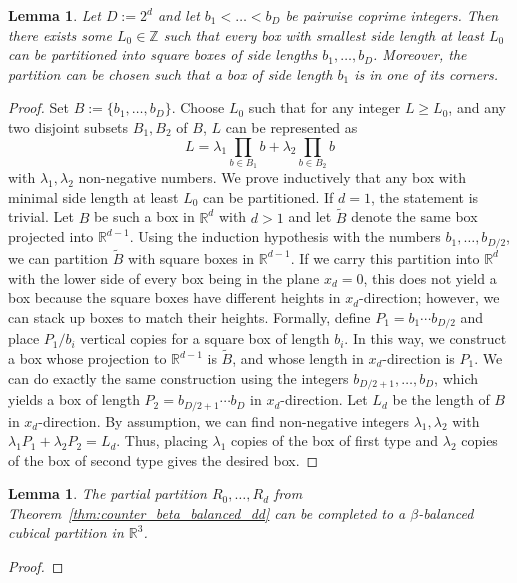 \documentclass[12pt]{article}
\newcommand{\R}{\mathbb{R}}
\newcommand{\Z}{\mathbb{Z}}
\newtheorem{lemma}[theorem]{Lemma}
\begin{document}
\begin{appendix}
\begin{lemma}\label{lem:square_filling}
Let $D:=2^d$ and let $b_1<\ldots<b_{D}$ be pairwise coprime integers.
Then there exists some $L_0\in\Z$ such that every box with smallest side length at least $L_0$
can be partitioned into square boxes of side lengths $b_1,\ldots,b_D$. Moreover, the partition
can be chosen such that a box of side length $b_1$ is in one of its corners.
\end{lemma}
\begin{proof}
Set $B:=\{b_1,\ldots,b_{D}\}$.
Choose $L_0$ such that for any integer $L\geq L_0$, and any two
disjoint subsets $B_1,B_2$ of $B$, 
$L$ can be represented as 
\[L=\lambda_1 \prod_{b\in B_1}b + \lambda_2\prod_{b\in B_2}b\]
with $\lambda_1,\lambda_2$ non-negative numbers.
We prove inductively that any box with minimal side length at least $L_0$
can be partitioned. If $d=1$, the statement is trivial.
Let $B$ be such a box in $\R^d$ with $d>1$ 
and let $\tilde{B}$ denote the same
box projected into $\R^{d-1}$. Using the induction hypothesis with the numbers
$b_1,\ldots,b_{D/2}$, we can partition $\tilde{B}$ with square boxes in $\R^{d-1}$.
If we carry this partition into $\R^d$ with the lower side of every box being in
the plane $x_d=0$, this does not yield a box because
the square boxes have different heights in $x_d$-direction; however, we can stack up
boxes to match their heights. Formally, define $P_1=b_1\cdots b_{D/2}$
and place $P_1/b_i$ vertical copies for a square box of length $b_i$. In this way,
we construct a box whose projection to $\R^{d-1}$ is $\tilde{B}$, and whose length
in $x_d$-direction is $P_1$.
We can do exactly the same construction using the integers $b_{D/2+1},\ldots,b_{D}$,
which yields a box of length $P_2=b_{D/2+1}\cdots b_{D}$ in $x_d$-direction.
Let $L_d$ be the length of $B$ in $x_d$-direction.
By assumption, we can find non-negative integers $\lambda_1,\lambda_2$ with
$\lambda_1 P_1 + \lambda_2 P_2=L_d$.
Thus, placing $\lambda_1$ copies of the box of first type and $\lambda_2$ copies
of the box of second type gives the desired box.
\end{proof}

\begin{lemma}
The partial partition $R_0,\ldots,R_d$ from Theorem~\ref{thm:counter_beta_balanced_dd} can be completed
to a $\beta$-balanced cubical partition in $\R^3$.
\end{lemma}

\begin{proof}


\end{proof}
\end{appendix}
\end{document}
